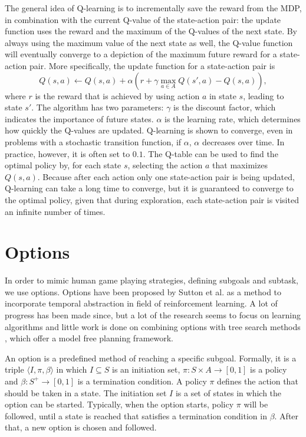 The general idea of Q-learning is to incrementally save the reward from the MDP,
in combination with the current Q-value of the state-action pair: the update
function uses the reward and the maximum of the Q-values of the next state. By
always using the maximum value of the next state as well, the Q-value function
will eventually converge to a depiction of the maximum future reward for a
state-action pair. More specifically, the update function for a state-action
pair is
\begin{equation}
	\label{eq:qlearning}
	Q(s, a) \gets Q(s, a) + \alpha \left(r + \gamma \max_{a \in A} Q(s', a) - Q(s, a)\right),
\end{equation}
where $r$ is the reward that is achieved by using action $a$ in state $s$,
leading to state $s'$. The algorithm has two parameters: $\gamma$ is the
discount factor, which indicates the importance of future states. $\alpha$ is the
learning rate, which determines how quickly the Q-values are updated.
Q-learning is shown to converge, even in problems with a stochastic transition
function, if $\alpha$, $\alpha$ decreases over time. In practice, however, it is
often set to $0.1$. The Q-table can be used to find the optimal policy by, for
each state $s$, selecting the action $a$ that maximizes $Q(s, a)$. Because after
each action only one state-action pair is being updated, Q-learning can take a
long time to converge, but it is guaranteed to converge to the optimal policy,
given that during exploration, each state-action pair is visited an infinite
number of times.

\section{Options}
\label{subsec:options}
In order to mimic human game playing strategies, defining subgoals and subtask,
we use options. Options have been proposed by Sutton et al.
\cite{sutton1999between} as a method to incorporate temporal abstraction in
field of reinforcement learning. A lot of progress has been made since, but a
lot of the research seems to focus on learning algorithms and little work is
done on combining options with tree search methods \cite{barto2003recent}, which
offer a model free planning framework.

An option is a predefined method of reaching a specific subgoal. Formally, it is
a triple $\langle I, \pi, \beta\rangle$ in which $I \subseteq S$ is an
initiation set, $\pi: S \times A \rightarrow [0, 1]$ is a policy and $\beta: S^+
\rightarrow[0,1]$ is a termination condition.  A policy $\pi$ defines the action
that should be taken in a state. The initiation set $I$ is a set of states in
which the option can be started. Typically, when the option starts, policy $\pi$
will be followed, until a state is reached that satisfies a termination
condition in $\beta$. After that, a new option is chosen and followed. 

